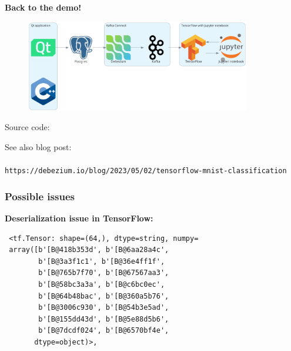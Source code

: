 \documentclass[10pt,utf8]{beamer}
\begin{document}
\begin{frame}
    \vspace*{1cm}
    \centering
    \textbf{\huge{Back to the demo!}}
    
    \vspace*{0.5cm}
    
    \begin{figure}
        \includegraphics[height=4cm]{./img/qt_to_tf.eps}
    \end{figure}
    
    \vspace*{-0.5cm}
    
    Source code: \\
    \color{black}
    
    \vspace*{0.2cm}
    
    See also blog post:\\
    \\
    \texttt{\small{https://debezium.io/blog/2023/05/02/tensorflow-mnist-classification}}
\end{frame}

\begin{frame}[fragile]
    \frametitle{Possible issues}
    \textbf{Deserialization issue in TensorFlow:}
    \vspace{0.5cm}
   \begin{lstlisting}
 <tf.Tensor: shape=(64,), dtype=string, numpy=
 array([b'[B@418b353d', b'[B@6aa28a4c',
        b'[B@3a3f1c1', b'[B@36e4ff1f',
        b'[B@765b7f70', b'[B@67567aa3',
        b'[B@58bc3a3a', b'[B@c6bc0ec',
        b'[B@64b48bac', b'[B@360a5b76',
        b'[B@3006c930', b'[B@54b3e5ad',
        b'[B@155dd43d', b'[B@5e88d5b6',
        b'[B@7dcdf024', b'[B@6570bf4e',
       dtype=object)>,
   \end{lstlisting}
\end{frame}
\end{document}
